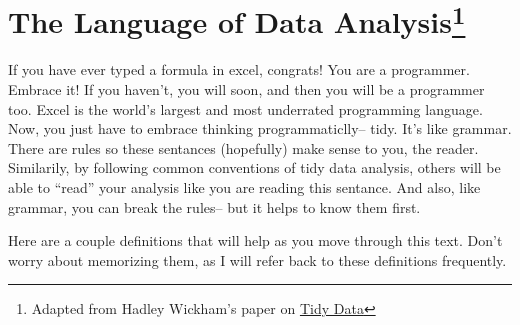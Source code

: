 \documentclass[]{book}
\begin{document}
\section[The Language of Data Analysis]{\texorpdfstring{The Language of
Data Analysis\footnote{Adapted from Hadley Wickham's paper on
  \href{https://vita.had.co.nz/papers/tidy-data.pdf}{Tidy Data}}}{The Language of Data Analysis}}\label{the-language-of-data-analysis}

If you have ever typed a formula in excel, congrats! You are a
programmer. Embrace it! If you haven't, you will soon, and then you will
be a programmer too. Excel is the world's largest and most underrated
programming language. Now, you just have to embrace thinking
programmaticlly-- tidy. It's like grammar. There are rules so these
sentances (hopefully) make sense to you, the reader. Similarily, by
following common conventions of tidy data analysis, others will be able
to ``read'' your analysis like you are reading this sentance. And also,
like grammar, you can break the rules-- but it helps to know them first.

Here are a couple definitions that will help as you move through this
text. Don't worry about memorizing them, as I will refer back to these
definitions frequently.
\end{document}
